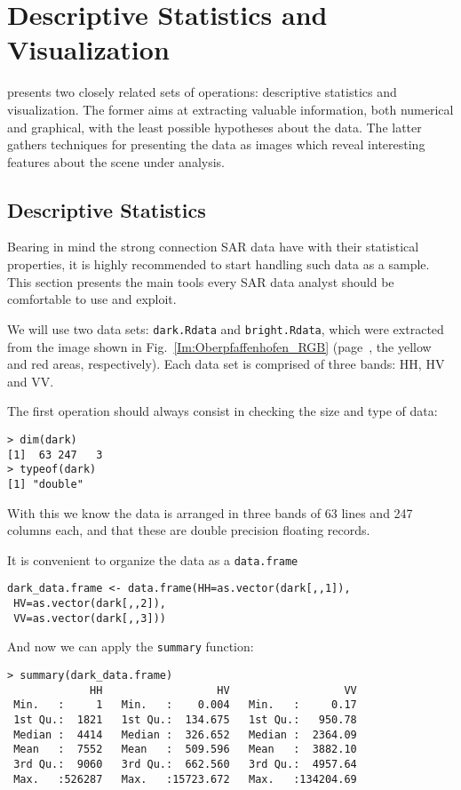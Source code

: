 \chapter{Descriptive Statistics and Visualization}\label{Chapter:DescriptiveVisualization}

 presents two closely related sets of operations:
descriptive statistics and visualization.
The former aims at extracting valuable information, both numerical and graphical, with the least possible hypotheses about the data.
The latter gathers techniques for presenting the data as images which reveal interesting features about the scene under analysis.

\section{Descriptive Statistics}

Bearing in mind the strong connection SAR data have with their statistical properties, it is highly recommended to start handling such data as a sample. This section presents the main tools every SAR data analyst should be comfortable to use and exploit.

We will use two data sets: \texttt{dark.Rdata} and \texttt{bright.Rdata}, which were extracted from the image shown in Fig.~\ref{Im:Oberpfaffenhofen_RGB} (page~\pageref{Im:Oberpfaffenhofen_RGB}, the yellow and red areas, respectively).
Each data set is comprised of three bands: HH, HV and VV.

The first operation should always consist in checking the size and type of data:
\begin{lstlisting}
> dim(dark)
[1]  63 247   3
> typeof(dark)
[1] "double"
\end{lstlisting}
With this we know the data is arranged in three bands of \num{63} lines and \num{247} columns each, and that these are double precision floating records.

It is convenient to organize the data as a \texttt{data.frame}
\begin{lstlisting}
dark_data.frame <- data.frame(HH=as.vector(dark[,,1]),
 HV=as.vector(dark[,,2]), 
 VV=as.vector(dark[,,3]))
\end{lstlisting}

And now we can apply the \texttt{summary} function:
\begin{lstlisting}
> summary(dark_data.frame)
             HH                  HV                  VV
 Min.   :     1   Min.   :    0.004   Min.   :     0.17  
 1st Qu.:  1821   1st Qu.:  134.675   1st Qu.:   950.78  
 Median :  4414   Median :  326.652   Median :  2364.09  
 Mean   :  7552   Mean   :  509.596   Mean   :  3882.10  
 3rd Qu.:  9060   3rd Qu.:  662.560   3rd Qu.:  4957.64  
 Max.   :526287   Max.   :15723.672   Max.   :134204.69  
\end{lstlisting}


